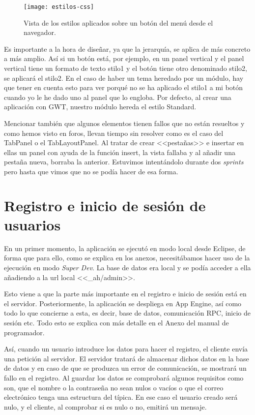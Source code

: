 \begin{figure}[h]
\centering
\texttt{[image: estilos-css]}
\caption{Vista de los estilos aplicados sobre un botón del menú desde el navegador.}
\label{fig:5.1}
\end{figure}

Es importante a la hora de diseñar, ya que la jerarquía, se aplica de más concreto a más amplio. Así si un botón está, por ejemplo, en un panel vertical y el panel vertical tiene un formato de texto stilo1 y el botón tiene otro denominado stilo2, se aplicará el stilo2. En el caso de haber un tema heredado por un módulo, hay que tener en cuenta esto para ver porqué no se ha aplicado el stilo1 a mi botón cuando yo le he dado uno al panel que lo engloba. Por defecto, al crear una aplicación con GWT, nuestro módulo hereda el estilo Standard. 

Mencionar también que algunos elementos tienen fallos que no están resueltos y como hemos visto en foros, llevan tiempo sin resolver como es el caso del TabPanel o el TabLayoutPanel. Al tratar de crear <<pestañas>> e insertar en ellas un panel con ayuda de la función insert, la vista fallaba y al añadir una pestaña nueva, borraba la anterior. Estuvimos intentándolo durante dos \emph{sprints} pero hasta que vimos que no se podía hacer de esa forma.

\section{Registro e inicio de sesión de usuarios}

En un primer momento, la aplicación se ejecutó en modo local desde Eclipse, de forma que para ello, como se explica en los anexos, necesitábamos hacer uso de la ejecución en modo \emph{Super Dev}. La base de datos era local y se podía acceder a ella añadiendo a la url local <<\_ah/admin>>.

Esto viene a que la parte más importante en el registro e inicio de sesión está en el servidor. Posteriormente, la aplicación se despliega en  App Engine, así como todo lo que concierne a esta, es decir, base de datos, comunicación RPC, inicio de sesión etc. Todo esto se explica con más detalle en el Anexo del manual de programador.

Así, cuando un usuario introduce los datos para hacer el registro, el cliente envía una petición al servidor. El servidor tratará de almacenar dichos datos en la base de datos y en caso de que se produzca un error de comunicación, se mostrará un fallo en el registro. Al guardar los datos se comprobará algunos requisitos como son, que el nombre o la contraseña no sean nulos o vacíos o que el correo electrónico tenga una estructura del típica. En ese caso el usuario creado será nulo, y el cliente, al comprobar si es nulo o no, emitirá un mensaje. 


